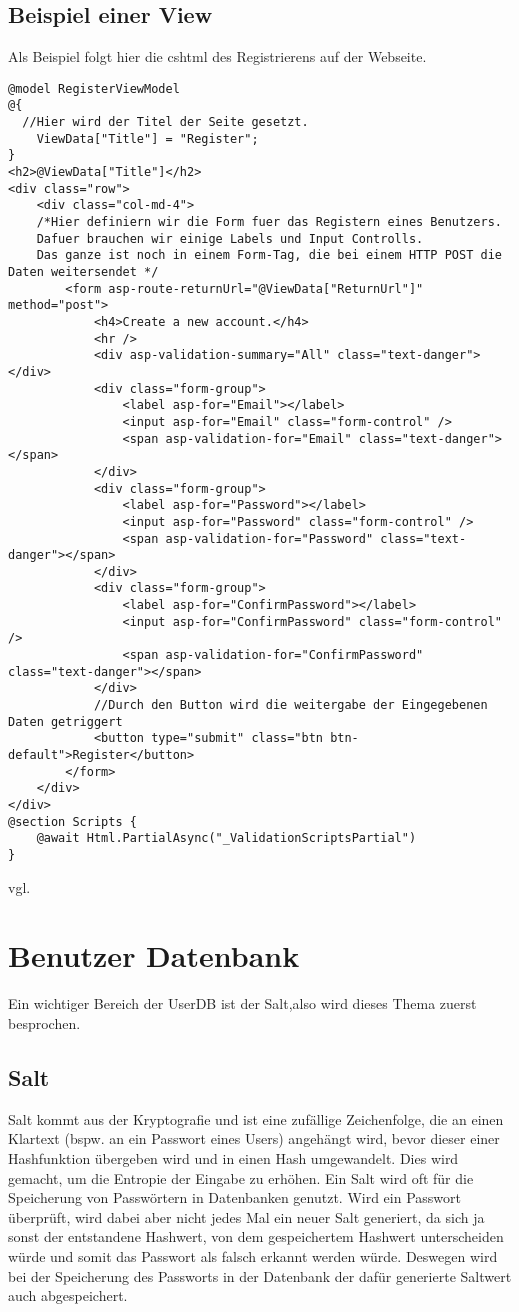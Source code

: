 {\subsection{Beispiel einer View}
\label{mvc_view_beispiel}
Als Beispiel folgt hier die cshtml des Registrierens auf der Webseite.
\begin{lstlisting}[caption={View Code example}]
@model RegisterViewModel
@{
  //Hier wird der Titel der Seite gesetzt.
    ViewData["Title"] = "Register";
}
<h2>@ViewData["Title"]</h2>
<div class="row">
    <div class="col-md-4">
    /*Hier definiern wir die Form fuer das Registern eines Benutzers.
    Dafuer brauchen wir einige Labels und Input Controlls. 
    Das ganze ist noch in einem Form-Tag, die bei einem HTTP POST die Daten weitersendet */
        <form asp-route-returnUrl="@ViewData["ReturnUrl"]" method="post">
            <h4>Create a new account.</h4>
            <hr />
            <div asp-validation-summary="All" class="text-danger"></div>
            <div class="form-group">
                <label asp-for="Email"></label>
                <input asp-for="Email" class="form-control" />
                <span asp-validation-for="Email" class="text-danger"></span>
            </div>
            <div class="form-group">
                <label asp-for="Password"></label>
                <input asp-for="Password" class="form-control" />
                <span asp-validation-for="Password" class="text-danger"></span>
            </div>
            <div class="form-group">
                <label asp-for="ConfirmPassword"></label>
                <input asp-for="ConfirmPassword" class="form-control" />
                <span asp-validation-for="ConfirmPassword" class="text-danger"></span>
            </div>
            //Durch den Button wird die weitergabe der Eingegebenen Daten getriggert
            <button type="submit" class="btn btn-default">Register</button>
        </form>
    </div>
</div>
@section Scripts {
    @await Html.PartialAsync("_ValidationScriptsPartial")
}
\end{lstlisting}
vgl. \textcite{mic_views}
\section{Benutzer Datenbank}
\label{sec:UserDB}
Ein wichtiger Bereich der UserDB ist der Salt,also wird dieses Thema zuerst besprochen.
\subsection{Salt}
\label{sec:salt}
Salt kommt aus der Kryptografie und ist eine zufällige Zeichenfolge, die an einen Klartext (bspw. an ein Passwort eines Users) angehängt wird, bevor dieser einer Hashfunktion übergeben wird und in einen Hash umgewandelt. Dies wird gemacht, um die Entropie der Eingabe zu erhöhen. Ein Salt wird oft für die Speicherung von Passwörtern in Datenbanken genutzt. Wird ein Passwort überprüft, wird dabei aber nicht jedes Mal ein neuer Salt generiert, da sich ja sonst der entstandene Hashwert, von dem gespeichertem Hashwert unterscheiden würde und somit das Passwort als falsch erkannt werden würde. Deswegen wird bei der Speicherung des Passworts in der Datenbank der dafür generierte Saltwert auch abgespeichert.
}
